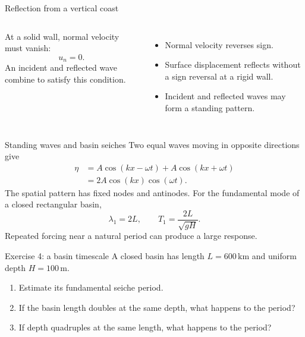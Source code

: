 \documentclass[aspectratio=169]{beamer}
\newcommand{\unit}[1]{\,\mathrm{#1}}
\begin{document}
\begin{frame}{Reflection from a vertical coast}
  \begin{columns}
      At a solid wall, normal velocity must vanish:
      \[
        u_n=0.
      \]
      An incident and reflected wave combine to satisfy this condition.
      \begin{itemize}
        \item Normal velocity reverses sign.
        \item Surface displacement reflects without a sign reversal at a rigid wall.
        \item Incident and reflected waves may form a standing pattern.
      \end{itemize}
      \centering
  \end{columns}
\end{frame}

\begin{frame}{Standing waves and basin seiches}
  Two equal waves moving in opposite directions give
  \begin{align*}
    \eta &= A\cos(kx-\omega t)+A\cos(kx+\omega t)\\
         &=2A\cos(kx)\cos(\omega t).
  \end{align*}
  The spatial pattern has fixed nodes and antinodes.
  For the fundamental mode of a closed rectangular basin,
  \[
    \lambda_1=2L,
    \qquad
    T_1=\frac{2L}{\sqrt{gH}}.
  \]
  Repeated forcing near a natural period can produce a large response.
\end{frame}

\begin{frame}{Exercise 4: a basin timescale}
  A closed basin has length $L=600\unit{km}$ and uniform depth $H=100\unit{m}$.
  \begin{enumerate}
    \item Estimate its fundamental seiche period.
    \item If the basin length doubles at the same depth, what happens to the period?
    \item If depth quadruples at the same length, what happens to the period?
  \end{enumerate}
\end{frame}
\end{document}
